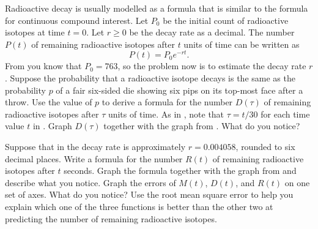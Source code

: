 \documentclass[a4paper,oneside,12pt]{article}
\begin{document}
\begin{problem}
\begin{packedenum}
  \item\label{subprob:exponential:aluminium_exponential_dice}
    Radioactive decay is usually modelled as a formula that is
    similar to the formula for continuous compound interest.  Let
    $P_0$ be the initial count of radioactive isotopes at time
    $t = 0$.  Let $r \geq 0$ be the decay rate as a decimal.  The
    number $P(t)$ of remaining radioactive isotopes after $t$ units of
    time can be written as
    \begin{equation}
    \label{eqn:exponential:aluminium_exponential_model_e}
    P(t)
    =
    P_0 e^{-rt}.
    \end{equation}
    From  you know
    that $P_0 = 763$, so the problem now is to estimate the decay rate
    $r$.  Suppose the probability that a radioactive isotope decays is
    the same as the probability $p$ of a fair six-sided die showing
    six pips on its top-most face after a throw.  Use the value of $p$
    to derive a formula for the number $D(\tau)$ of remaining
    radioactive isotopes after $\tau$ units of time.  As
    in , note
    that $\tau = t / 30$ for each time value $t$ in
    .  Graph
    $D(\tau)$ together with the graph
    from .  What
    do you notice?

  \item\label{subprob:exponential:aluminium_mean_decay_rate}
    Suppose that in
     the decay
    rate is approximately $r = 0.004058$, rounded to six decimal
    places.  Write a formula for the number $R(t)$ of remaining
    radioactive isotopes after $t$ seconds.  Graph the formula
    together with the graph
    from  and
    describe what you notice.  Graph the errors of $M(t)$, $D(t)$, and
    $R(t)$ on one set of axes.  What do you notice?  Use the root mean
    square error to help you explain which one of the three functions
    is better than the other two at predicting the number of remaining
    radioactive isotopes.
  \end{packedenum}
\end{problem}
\end{document}
